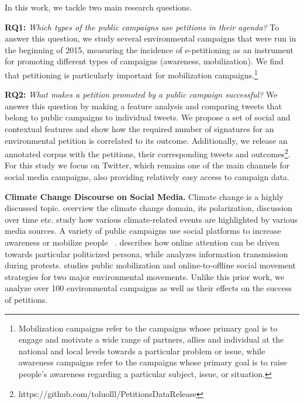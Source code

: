 In this work, we tackle two main research questions.

\textbf{RQ1:} \textit{Which types of the public campaigns use petitions in their agenda?}
To answer this question, we study several environmental campaigns that were run in the beginning of 2015, measuring the incidence of e-petitioning as an instrument for promoting different types of campaigns (awareness, mobilization). We find that petitioning is particularly important for mobilization campaigns.\footnote{Mobilization campaigns refer to the campaigns whose primary goal is to engage and motivate a wide range of partners, allies and individual at the national and local levels towards a particular problem or issue, while awareness campaigns refer to the campaigns whose primary goal is to raise people’s awareness regarding a particular subject, issue, or situation.}

\textbf{RQ2:} \textit{What makes a petition promoted by a public campaign successful?} We answer this question by making a feature analysis and comparing tweets that belong to public campaigns to individual tweets. 
%
We propose a set of social and contextual features and show how the required number of signatures for an environmental petition is correlated to its outcome.
Additionally, we release an annotated corpus with the petitions, their corresponding tweets and outcomes\footnote{https://github.com/toluolll/PetitionsDataRelease}.
For this study we focus on Twitter, which remains one of the main channels for social media campaigns, also providing relatively easy access to campaign data.

\textbf{Climate Change Discourse on Social Media.} Climate change is a highly discussed topic. \citeauthor{Kirilenko2014}  overview the climate change domain, its polarization, discussion over time etc. \citeauthor{Olteanu2015}  study how various climate-related events are highlighted by various media sources.
A variety of public campaigns use social platforms to increase awareness or mobilize people~\citeauthor{Mahmud2014} .
\citeauthor{Tufekci2013}  describes how online attention can be driven towards particular politicized persona, while \citeauthor{gonzalez2013networked}  analyzes information transmission during protests.
\citeauthor{hestres2013preaching}  studies public mobilization and online-to-offline social movement strategies for two major environmental movements. Unlike this prior work, we analyze over 100 environmental campaigns as well as their effects on the success of petitions.

